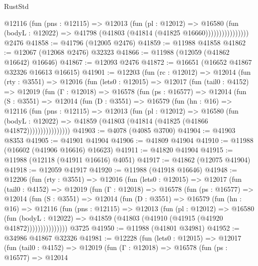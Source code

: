 \begin{lexlean}{RustStd}
\begin{coremodule}
                      @12116
                        (fun (pns : @12115) =>
                        @12013
                          (fun (pl : @12012) =>
                          @16580
                            (fun (bodyL : @12022) =>
                            @41798 (@41803 (@41814 (@41825 @16660))))))))))))))))
    @2476
@41858 := @41796 (@12005 @2476)
@41859 := @11988 @41858
@41862 := @12067 (@12068 @2476) @32323
@41866 := @11988 (@12059 (@41862 @16642) @16646)
@41867 := @12093 @2476
@41872 := @16651 (@16652 @41867 @32326 @16613 @16615)
@41901 := @12203
    (fun (rc : @12012) =>
    @12014
      (fun (rty : @3551) =>
      @12016
        (fun (lets0 : @12015) =>
        @12017
          (fun (tail0 : @4152) =>
          @12019
            (fun (Γ : @12018) =>
            @16578
              (fun (ps : @16577) =>
              @12014
                (fun (S : @3551) =>
                @12014
                  (fun (D : @3551) =>
                  @16579
                    (fun (hn : @16) =>
                    @12116
                      (fun (pns : @12115) =>
                      @12013
                        (fun (pl : @12012) =>
                        @16580
                          (fun (bodyL : @12022) =>
                          @41859 (@41803 (@41814 (@41825 (@41866 @41872))))))))))))))))
@41903 := @4078 (@4085 @3700)
@41904 := @41903 @8353
@41905 := @41901 @41904
@41906 := @41809 @41904
@41910 := @11988 (@16602 (@41906 @16616) @16623)
@41911 := @41820 @41904
@41915 := @11988 (@12118 (@41911 @16616) @4051)
@41917 := @41862 (@12075 @41904)
@41918 := @12059 @41917
@41920 := @11988 (@41918 @16646)
@41948 := @12206
    (fun (rty : @3551) =>
    @12016
      (fun (lets0 : @12015) =>
      @12017
        (fun (tail0 : @4152) =>
        @12019
          (fun (Γ : @12018) =>
          @16578
            (fun (ps : @16577) =>
            @12014
              (fun (S : @3551) =>
              @12014
                (fun (D : @3551) =>
                @16579
                  (fun (hn : @16) =>
                  @12116
                    (fun (pns : @12115) =>
                    @12013
                      (fun (pl : @12012) =>
                      @16580
                        (fun (bodyL : @12022) =>
                        @41859 (@41803 (@41910 (@41915 (@41920 @41872)))))))))))))))
    @3725
@41950 := @11988 (@41801 @34981)
@41952 := @34986 @41867 @32326
@41981 := @12228
    (fun (lets0 : @12015) =>
    @12017
      (fun (tail0 : @4152) =>
      @12019
        (fun (Γ : @12018) =>
        @16578
          (fun (ps : @16577) =>
          @12014

\end{coremodule}
\end{lexlean}
